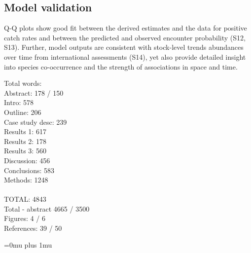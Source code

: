 \documentclass{nature}
\begin{document}
\begin{linenumbers}
\subsection{Model validation}

Q-Q plots show good fit between the derived estimates and the data for positive
catch rates and between the predicted and observed encounter probability (S12,
S13).  Further, model outputs are consistent with stock-level trends abundances
over time from international assessments (S14), yet also provide detailed
insight into species co-occurrence and the strength of associations in space
and time. 

Total words: \\
Abstract:	 	  178 / 150 \\
Intro:   		  578  \\
Outline:		  206 \\
Case study desc:	  239 \\
Results 1:		  617 \\
Results 2:		  178 \\
Results 3:		  560 \\
Discussion:	          456 \\
Conclusions:	          583  \\
Methods:		  1248 \\
\\
TOTAL:			 4843 \\
Total - abstract         4665 / 3500 \\

Figures: 4 / 6 \\
References: 39 / 50 \\

\end{linenumbers}
\newpage
\Urlmuskip=0mu plus 1mu\relax

\small{}



\end{document}
